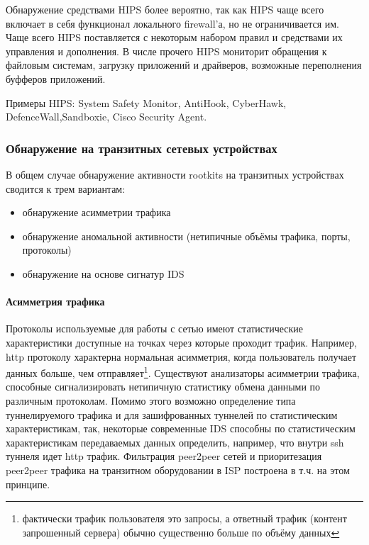 Обнаружение средствами HIPS более вероятно, так как HIPS чаще всего включает в себя функционал
локального firewall'а, но не ограничивается им. Чаще всего HIPS поставляется с некоторым набором
правил и средствами их управления и дополнения. В числе прочего HIPS мониторит обращения к файловым
системам, загрузку приложений и драйверов, возможные переполнения буфферов приложений.

Примеры HIPS: System Safety Monitor, AntiHook, CyberHawk,
DefenceWall,Sandboxie, Cisco Security Agent.

\subsubsection{Обнаружение на транзитных сетевых устройствах}

В общем случае обнаружение активности rootkits на транзитных устройствах
сводится к  трем вариантам:

\begin{itemize}
\item{обнаружение асимметрии трафика}
\item{обнаружение аномальной активности (нетипичные объёмы трафика, порты, протоколы)}
\item{обнаружение на основе сигнатур IDS}
\end{itemize}


\paragraph{Асимметрия трафика\\}
Протоколы используемые для работы с сетью имеют статистические
характеристики доступные на точках через которые проходит трафик.
Например, http протоколу характерна нормальная асимметрия, когда
пользователь получает данных больше, чем отправляет\footnote{фактически
трафик пользователя это запросы, а ответный трафик (контент запрошенный
сервера) обычно существенно больше по объёму данных}. Существуют
анализаторы асимметрии трафика, способные сигнализировать нетипичную
статистику обмена данными по различным протоколам. Помимо этого возможно
 определение типа туннелируемого трафика и для зашифрованных туннелей по
статистическим характеристикам, так, некоторые современные IDS способны
по статистическим характеристикам передаваемых данных определить, например,
что внутри ssh туннеля идет http трафик. Фильтрация peer2peer сетей и приоритезация
peer2peer трафика на транзитном оборудовании в ISP построена в т.ч. на этом принципе.

